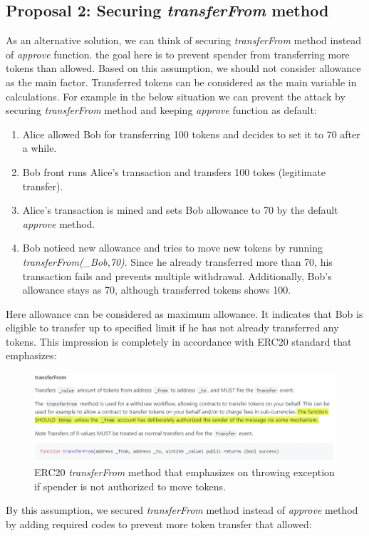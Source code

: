 \subsection{Proposal 2: Securing \textit{transferFrom} method}
As an alternative solution, we can think of securing \textit{transferFrom} method instead of \textit{approve} function. the goal here is to prevent spender from transferring more tokens than allowed. Based on this assumption, we should not consider allowance as the main factor. Transferred tokens can be considered as the main variable in calculations. For example in the below situation we can prevent the attack by securing \textit{transferFrom} method and keeping \textit{approve} function as default:
\begin{enumerate}
	\item Alice allowed Bob for transferring 100 tokens and decides to set it to 70 after a while.
	\item Bob front runs Alice’s transaction and transfers 100 tokes (legitimate transfer).
	\item Alice’s transaction is mined and sets Bob allowance to 70 by the default \textit{approve} method.
	\item Bob noticed new allowance and tries to move new tokens by running \textit{transferFrom(\_Bob,70)}. Since he already transferred more than 70, his transaction fails and prevents multiple withdrawal. Additionally, Bob’s allowance stays as 70, although transferred tokens shows 100.
\end{enumerate}
Here allowance can be considered as maximum allowance. It indicates that Bob is eligible to transfer up to specified limit if he has not already transferred any tokens. This impression is completely in accordance with ERC20 standard that emphasizes:
\begin{figure}[H]
	\centering
	\includegraphics[width=1.0\linewidth]{figures/multiple_withdrawal_30.png}
	\caption{ERC20 \textit{transferFrom} method that emphasizes on throwing exception if spender is not authorized to move tokens.}
\end{figure}
\noindent By this assumption, we secured \textit{transferFrom} method instead of \textit{approve} method by adding required codes to prevent more token transfer that allowed:
